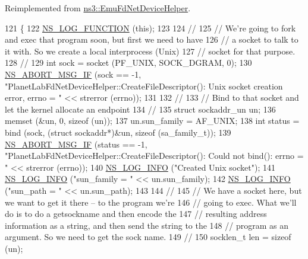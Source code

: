Reimplemented from \hyperlink{classns3_1_1EmuFdNetDeviceHelper_a64392b0acfeddf0121b251bc7e6e8906}{ns3\+::\+Emu\+Fd\+Net\+Device\+Helper}.


\begin{DoxyCode}
121 \{
122   \hyperlink{log-macros-disabled_8h_a90b90d5bad1f39cb1b64923ea94c0761}{NS\_LOG\_FUNCTION} (\textcolor{keyword}{this});
123 
124   \textcolor{comment}{//}
125   \textcolor{comment}{// We're going to fork and exec that program soon, but first we need to have}
126   \textcolor{comment}{// a socket to talk to it with.  So we create a local interprocess (Unix)}
127   \textcolor{comment}{// socket for that purpose.}
128   \textcolor{comment}{//}
129   \textcolor{keywordtype}{int} sock = socket (PF\_UNIX, SOCK\_DGRAM, 0);
130   \hyperlink{group__fatal_ga6653324225bc139e46deea177614ceee}{NS\_ABORT\_MSG\_IF} (sock == -1, \textcolor{stringliteral}{"PlanetLabFdNetDeviceHelper::CreateFileDescriptor(): Unix
       socket creation error, errno = "} << strerror (errno));
131 
132   \textcolor{comment}{//}
133   \textcolor{comment}{// Bind to that socket and let the kernel allocate an endpoint}
134   \textcolor{comment}{//}
135   \textcolor{keyword}{struct }sockaddr\_un un;
136   memset (&un, 0, \textcolor{keyword}{sizeof} (un));
137   un.sun\_family = AF\_UNIX;
138   \textcolor{keywordtype}{int} status = bind (sock, (\textcolor{keyword}{struct} sockaddr*)&un, \textcolor{keyword}{sizeof} (sa\_family\_t));
139   \hyperlink{group__fatal_ga6653324225bc139e46deea177614ceee}{NS\_ABORT\_MSG\_IF} (status == -1, \textcolor{stringliteral}{"PlanetLabFdNetDeviceHelper::CreateFileDescriptor(): Could
       not bind(): errno = "} << strerror (errno));
140   \hyperlink{group__logging_gafbd73ee2cf9f26b319f49086d8e860fb}{NS\_LOG\_INFO} (\textcolor{stringliteral}{"Created Unix socket"});
141   \hyperlink{group__logging_gafbd73ee2cf9f26b319f49086d8e860fb}{NS\_LOG\_INFO} (\textcolor{stringliteral}{"sun\_family = "} << un.sun\_family);
142   \hyperlink{group__logging_gafbd73ee2cf9f26b319f49086d8e860fb}{NS\_LOG\_INFO} (\textcolor{stringliteral}{"sun\_path = "} << un.sun\_path);
143 
144   \textcolor{comment}{//}
145   \textcolor{comment}{// We have a socket here, but we want to get it there -- to the program we're}
146   \textcolor{comment}{// going to exec.  What we'll do is to do a getsockname and then encode the}
147   \textcolor{comment}{// resulting address information as a string, and then send the string to the}
148   \textcolor{comment}{// program as an argument.  So we need to get the sock name.}
149   \textcolor{comment}{//}
150   socklen\_t len = \textcolor{keyword}{sizeof} (un);

\end{DoxyCode}
